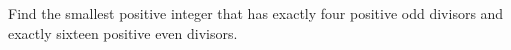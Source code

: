 Find the smallest positive integer that has exactly four positive odd divisors and exactly sixteen positive even divisors.
